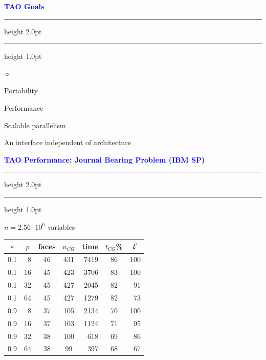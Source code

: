 \documentclass{seminar}
\newcommand{\reddiamond}{\textcolor{BrickRed}{$\diamond$}}
\newcommand{\redstripe}{\textcolor{BrickRed}{\hrule height 2.0pt\hfil}
             \vspace{-1.8pt}
             \textcolor{BrickRed}{\hrule height 1.0pt\hfil}
}
\newcommand{\heading}[1]{%
   \vspace*{0.5pt}%
   \centerline{\textcolor{Blue}{\textbf{#1}}}%
   \redstripe
}
\begin{document}
\begin{slide}

\heading{TAO Goals}

\begin{list}{\reddiamond}{}
\item
Portability
\item
Performance
\item
Scalable parallelism
\item
An interface independent of architecture
\end{list}

\vfill

\end{slide}


\begin{slide}

\heading{TAO Performance: Journal Bearing Problem (IBM SP)}

\centerline{$ n = 2.56 \cdot 10^6 $ variables}

\small
\begin{table}[htbp]
\begin{center}
\begin{tabular}{| c r | c c r c r |}
\hline
\multicolumn{1}{|c}{$ \varepsilon $} & 
\multicolumn{1}{c|}{$ p $} & 
\multicolumn{1}{c}{faces} &
\multicolumn{1}{c}{$n_{CG}$} & 
\multicolumn{1}{c}{time} &
\multicolumn{1}{c}{$t_{CG}$\%} & 
\multicolumn{1}{c|}{$ \cal E $} \\ \hline
0.1  & 8 & 46 & 431 & 7419 & 86 & 100  \\ 
0.1  & 16 & 45 & 423 & 3706 & 83 & 100  \\
0.1  & 32 & 45 & 427 & 2045 & 82 & 91 \\
0.1  & 64 & 45 & 427 & 1279 & 82 & 73 \\
\hline
0.9  & 8 & 37 & 105 & 2134 & 70 & 100 \\
0.9  & 16 & 37 & 103 & 1124 & 71 & 95 \\
0.9  & 32 & 38 & 100 & 618 & 69 & 86 \\
0.9  & 64 & 38 & 99 & 397 & 68 & 67 \\
\hline
\end{tabular}
\end{center}
\end{table}

\end{slide}
\end{document}
